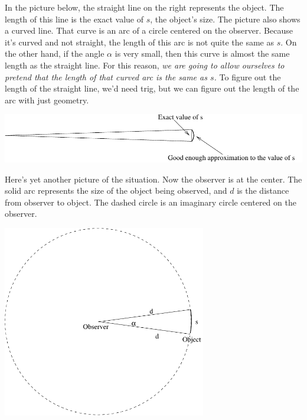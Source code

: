 In the picture below, the straight line on the right
represents the
object.  The length of this line is the exact value of $s$, the object's
size.  The picture also shows a curved line.  That curve is an arc
of a circle centered on the observer.  Because it's curved and not straight,
the length of this arc is not quite the same as $s$.  On the other hand,
if the angle $\alpha$ is very small, then this curve is almost the same
length as the straight line.  For this reason, {\it we are going to allow
ourselves to pretend that the length of that curved arc is the
same as $s$.}  To figure out the length of the straight line, we'd
need trig, but we can figure out the length of the arc with just
geometry.


\vspace{0.4in}
\centerline{\includegraphics[width=6in]{angularsize/angularsizefig2.pdf}}
\vspace{0.4in}

\pagebreak[3]

Here's yet another picture of the situation.  Now the observer is at
the center.  The solid arc represents the size of the object being observed,
and $d$ is the distance from observer to object.  The dashed circle
is an imaginary circle centered on the observer.

\medskip
\centerline{\includegraphics[width=3.5in]{angularsize/angularsizefig3.pdf}}
\medskip

